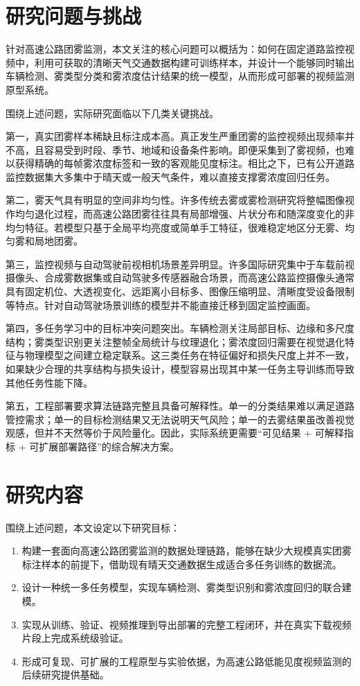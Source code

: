 \section{研究问题与挑战}

针对高速公路团雾监测，本文关注的核心问题可以概括为：如何在固定道路监控视频中，利用可获取的清晰天气交通数据构建可训练样本，并设计一个能够同时输出车辆检测、雾类型分类和雾浓度估计结果的统一模型，从而形成可部署的视频监测原型系统。

围绕上述问题，实际研究面临以下几类关键挑战。

第一，真实团雾样本稀缺且标注成本高。真正发生严重团雾的监控视频出现频率并不高，且容易受到时段、季节、地域和设备条件影响。即便采集到了雾视频，也难以获得精确的每帧雾浓度标签和一致的客观能见度标注。相比之下，已有公开道路监控数据集大多集中于晴天或一般天气条件，难以直接支撑雾浓度回归任务\cite{uadetrac}。

第二，雾天气具有明显的空间非均匀性。许多传统去雾或雾检测研究将整幅图像视作均匀退化过程，而高速公路团雾往往具有局部增强、片状分布和随深度变化的非均匀特征。若模型只基于全局平均亮度或简单手工特征，很难稳定地区分无雾、均匀雾和局地团雾。

第三，监控视频与自动驾驶前视相机场景差异明显。许多国际研究集中于车载前视摄像头、合成雾数据集或自动驾驶多传感器融合场景，而高速公路监控摄像头通常具有固定机位、大透视变化、远距离小目标多、图像压缩明显、清晰度受设备限制等特点。针对自动驾驶场景训练的模型并不能直接迁移到固定监控画面\cite{uadetrac,robustWeatherDetection2024}。

第四，多任务学习中的目标冲突问题突出。车辆检测关注局部目标、边缘和多尺度结构；雾类型识别更关注整帧全局统计与纹理退化；雾浓度回归需要在视觉退化特征与物理模型之间建立稳定联系。这三类任务在特征偏好和损失尺度上并不一致，如果缺少合理的共享结构与损失设计，模型容易出现其中某一任务主导训练而导致其他任务性能下降\cite{caruana1997multitask}。

第五，工程部署要求算法链路完整且具备可解释性。单一的分类结果难以满足道路管控需求；单一的目标检测结果又无法说明天气风险；单一的去雾结果虽改善视觉观感，但并不天然等价于风险量化。因此，实际系统更需要“可见结果 + 可解释指标 + 可扩展部署路径”的综合解决方案。

\section{研究内容}

围绕上述问题，本文设定以下研究目标：

\begin{enumerate}[leftmargin=2.5em]
\item 构建一套面向高速公路团雾监测的数据处理链路，能够在缺少大规模真实团雾标注样本的前提下，借助现有晴天交通数据生成适合多任务训练的数据流。
\item 设计一种统一多任务模型，实现车辆检测、雾类型识别和雾浓度回归的联合建模。
\item 实现从训练、验证、视频推理到导出部署的完整工程闭环，并在真实下载视频片段上完成系统级验证。
\item 形成可复现、可扩展的工程原型与实验依据，为高速公路低能见度视频监测的后续研究提供基础。
\end{enumerate}

